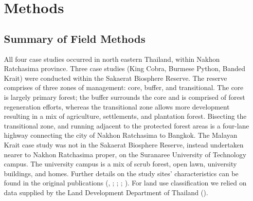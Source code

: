 \documentclass[10pt,a4paper]{article}
\begin{document}
\section{Methods}\label{methods}

\subsection{Summary of Field Methods}\label{summary-of-field-methods}

All four case studies occurred in north eastern Thailand, within Nakhon Ratchasima province.
Three case studies (King Cobra, Burmese Python, Banded Krait) were conducted within the Sakaerat Biosphere Reserve.
The reserve comprises of three zones of management: core, buffer, and transitional.
The core is largely primary forest; the buffer surrounds the core and is comprised of forest regeneration efforts, whereas the transitional zone allows more development resulting in a mix of agriculture, settlements, and plantation forest.
Bisecting the transitional zone, and running adjacent to the protected forest areas is a four-lane highway connecting the city of Nakhon Ratchasima to Bangkok.
The Malayan Krait case study was not in the Sakaerat Biosphere Reserve, instead undertaken nearer to Nakhon Ratchasima proper, on the Suranaree University of Technology campus.
The university campus is a mix of scrub forest, open lawn, university buildings, and homes.
Further details on the study sites' characteristics can be found in the original publications (, ; ; ; ).
For land use classification we relied on data supplied by the Land Development Department of Thailand ().
\end{document}
